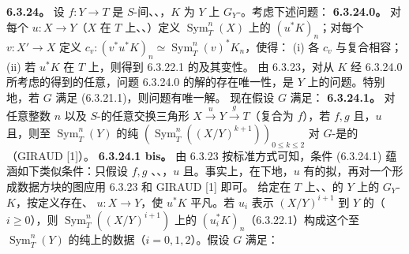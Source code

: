 \textbf{6.3.24。} 设 $f:Y\to T$ 是 $S$-间、、，$K$ 为 $Y$ 上 $G_Y$-。考虑下述问题：
\textbf{6.3.24.0。} 对每个 $u:X\to Y$（$X$ 在 $T$ 上、、）定义 $\operatorname{Sym}_T^n(X)$ 上的 $(u^*K)_n$；对每个 $v:X'\to X$ 定义 $c_v:(v^*u^*K)_n\simeq\operatorname{Sym}_T^n(v)^*K_n$，使得：
(i) 各 $c_v$ 与复合相容；
(ii) 若 $u^*K$ 在 $T$ 上，则得到 6.3.22.1 的及其变性。
由 6.3.23，对从 $K$ 经 6.3.24.0 所考虑的得到的任意，问题 6.3.24.0 的解的存在唯一性，是 $Y$ 上的问题。特别地，若 $G$ 满足 (6.3.21.1)，则问题有唯一解。
现在假设 $G$ 满足：
\textbf{6.3.24.1。} 对任意整数 $n$ 以及 $S$-的任意交换三角形 $X\xrightarrow{u}Y\xrightarrow{g}T$（复合为 $f$），若 $f,g$ 且，$u$ 且，则至 $\operatorname{Sym}_T^n(Y)$ 的纯 $(\operatorname{Sym}_T^n((X/Y)^{k+1}))_{0\le k\le2}$ 对 $G$-是的（GIRAUD [1]）。
\textbf{6.3.24.1 bis。} 由 6.3.23 按标准方式可知，条件 (6.3.24.1) 蕴涵如下类似条件：只假设 $f,g$ 、、，$u$ 且。事实上，在下地，$u$ 有的拟，再对一个形成数据方块的图应用 6.3.23 和 GIRAUD [1] 即可。
给定在 $T$ 上、、的 $Y$ 上的 $G_Y$- $K$，按定义存在、 $u:X\to Y$，使 $u^*K$ 平凡。若 $u_i$ 表示 $(X/Y)^{i+1}$ 到 $Y$ 的（$i\ge0$），则 $\operatorname{Sym}_T^n((X/Y)^{i+1})$ 上的 $(u_i^*K)_n$（6.3.22.1）构成这个至 $\operatorname{Sym}_T^n(Y)$ 的纯上的数据（$i=0,1,2$）。假设 $G$ 满足：
